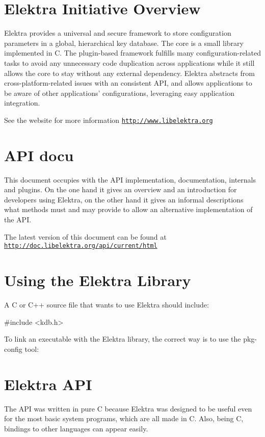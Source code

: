 \hypertarget{index_overview}{}\section{Elektra Initiative Overview}\label{index_overview}
Elektra provides a universal and secure framework to store configuration parameters in a global, hierarchical key database. The core is a small library implemented in C. The plugin-\/based framework fulfills many configuration-\/related tasks to avoid any unnecessary code duplication across applications while it still allows the core to stay without any external dependency. Elektra abstracts from cross-\/platform-\/related issues with an consistent A\-P\-I, and allows applications to be aware of other applications' configurations, leveraging easy application integration.

See the website for more information \href{http://www.libelektra.org}{\tt http\-://www.\-libelektra.\-org}\hypertarget{index_focus}{}\section{A\-P\-I docu}\label{index_focus}
This document occupies with the A\-P\-I implementation, documentation, internals and plugins. On the one hand it gives an overview and an introduction for developers using Elektra, on the other hand it gives an informal descriptions what methods must and may provide to allow an alternative implementation of the A\-P\-I.

The latest version of this document can be found at \href{http://doc.libelektra.org/api/current/html}{\tt http\-://doc.\-libelektra.\-org/api/current/html}\hypertarget{index_using}{}\section{Using the Elektra Library}\label{index_using}
A C or C++ source file that wants to use Elektra should include\-: 
\begin{DoxyCode}
\textcolor{preprocessor}{#include <kdb.h>}
\end{DoxyCode}


To link an executable with the Elektra library, the correct way is to use the {\ttfamily pkg-\/config} tool\-: 
\hypertarget{index_classes}{}\section{Elektra A\-P\-I}\label{index_classes}
The A\-P\-I was written in pure C because Elektra was designed to be useful even for the most basic system programs, which are all made in C. Also, being C, bindings to other languages can appear easily.

